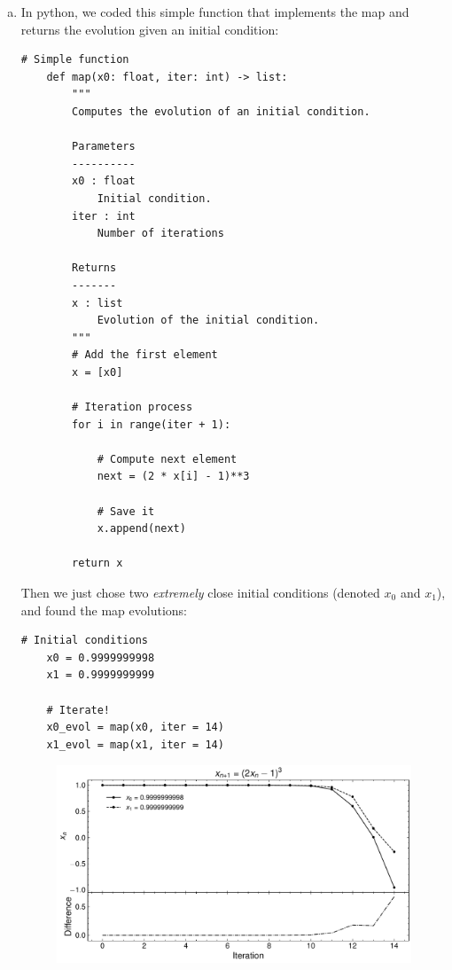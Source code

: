 \begin{enumerate}[(a)]
    \item In python, we coded this simple function that implements
    the map and returns the evolution given an initial condition:
    \begin{lstlisting}[style=pythonstyle]
    # Simple function
    def map(x0: float, iter: int) -> list:
        """
        Computes the evolution of an initial condition.

        Parameters
        ----------
        x0 : float
            Initial condition.
        iter : int
            Number of iterations

        Returns
        -------
        x : list
            Evolution of the initial condition.
        """
        # Add the first element
        x = [x0]

        # Iteration process
        for i in range(iter + 1):
            
            # Compute next element
            next = (2 * x[i] - 1)**3

            # Save it
            x.append(next)

        return x
    \end{lstlisting}

    Then we just chose two \textit{extremely} close initial conditions (denoted $x_0$ and $x_1$),
    and found the map evolutions:
    \begin{lstlisting}[style=pythonstyle]
    # Initial conditions
    x0 = 0.9999999998
    x1 = 0.9999999999

    # Iterate!
    x0_evol = map(x0, iter = 14)
    x1_evol = map(x1, iter = 14)
    \end{lstlisting}

    \begin{figure}[!ht]
        \centering
        \includegraphics[scale=0.6]{images/4a.pdf}
        \label{fig:4a}
    \end{figure}


\end{enumerate}
